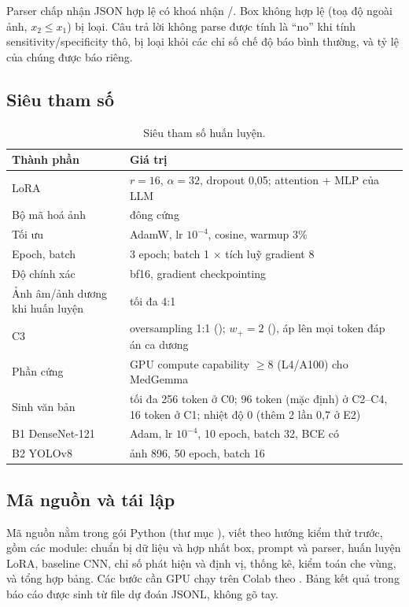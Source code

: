 Parser chấp nhận JSON hợp lệ có khoá  nhận /. Box không hợp lệ (toạ độ ngoài
ảnh, $x_2 \le x_1$) bị loại. Câu trả lời không parse được tính là ``no'' khi tính sensitivity/specificity thô,
bị loại khỏi các chỉ số chế độ báo bình thường, và tỷ lệ của chúng được báo riêng.

\subsection{Siêu tham số}

\begin{table}[H]
\centering
\caption{Siêu tham số huấn luyện.}
\label{tab:hparams}
\small
\begin{tabularx}{\textwidth}{@{}p{4.2cm} L@{}}
\toprule
\textbf{Thành phần} & \textbf{Giá trị} \\
\midrule
LoRA & $r = 16$, $\alpha = 32$, dropout 0,05; attention + MLP của LLM \\
Bộ mã hoá ảnh & đông cứng \\
Tối ưu & AdamW, lr $10^{-4}$, cosine, warmup 3\% \\
Epoch, batch & 3 epoch; batch 1 $\times$ tích luỹ gradient 8 \\
Độ chính xác & bf16, gradient checkpointing \\
Ảnh âm/ảnh dương khi huấn luyện & tối đa 4:1 \\
C3 & oversampling 1:1 (); $w_{+} = 2$ (), áp lên mọi token đáp án ca dương \\
Phần cứng & GPU compute capability $\ge 8$ (L4/A100) cho MedGemma \\
Sinh văn bản & tối đa 256 token ở C0; 96 token (mặc định) ở C2--C4, 16 token ở C1; nhiệt độ 0 (thêm 2 lần 0,7 ở E2) \\
B1 DenseNet-121 & Adam, lr $10^{-4}$, 10 epoch, batch 32, BCE có  \\
B2 YOLOv8 & ảnh 896, 50 epoch, batch 16 \\
\bottomrule
\end{tabularx}
\end{table}

\subsection{Mã nguồn và tái lập}

Mã nguồn nằm trong gói Python  (thư mục ), viết theo hướng kiểm thử trước, gồm các
module: chuẩn bị dữ liệu và hợp nhất box, prompt và parser, huấn luyện LoRA, baseline CNN, chỉ số phát hiện và
định vị, thống kê, kiểm toán che vùng, và tổng hợp bảng. Các bước cần GPU chạy trên Colab theo .
Bảng kết quả trong báo cáo được sinh từ file dự đoán JSONL, không gõ tay.

